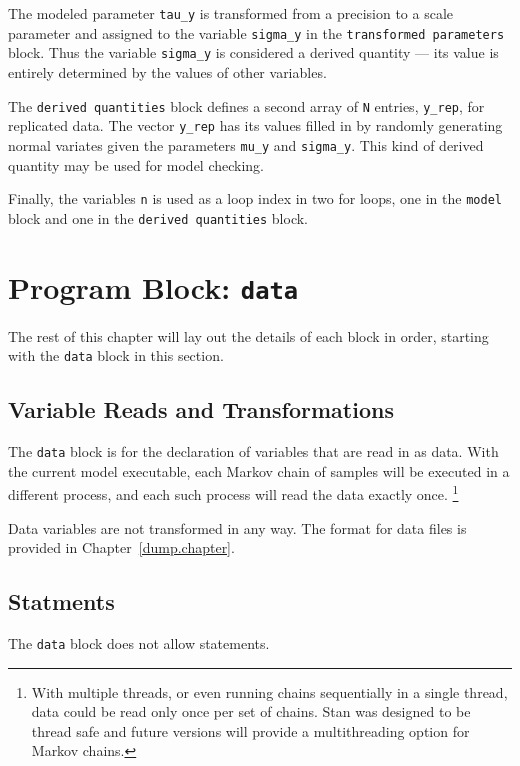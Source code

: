 \documentclass[10pt]{report}
\newcommand{\Stan}{Stan\xspace}
\newcommand{\code}[1]{{\tt #1}}
\newcommand{\refchapter}[1]{Chapter~\ref{#1.chapter}}
\begin{document}
The modeled parameter \code{tau\_y} is transformed from a precision to
a scale parameter and assigned to the variable \code{sigma\_y} in the
\code{transformed parameters} block. Thus the variable \code{sigma\_y}
is considered a derived quantity --- its value is entirely determined
by the values of other variables.  

The \code{derived quantities} block defines a second array of \code{N}
entries, \code{y\_rep}, for replicated data.  The vector \code{y\_rep}
has its values filled in by randomly generating normal variates given
the parameters \code{mu\_y} and \code{sigma\_y}.  This kind of derived
quantity may be used for model checking.

Finally, the variables \code{n} is used as a loop index in two for
loops, one in the \code{model} block and one in the \code{derived
  quantities} block.


\section{Program Block: \code{data}}

The rest of this chapter will lay out the details of each block in
order, starting with the \code{data} block in this section.

\subsection{Variable Reads and Transformations}

The \code{data} block is for the declaration of variables that are
read in as data.  With the current model executable, each Markov chain
of samples will be executed in a different process, and each such
process will read the data exactly once.%
%
\footnote{With multiple threads, or even running chains sequentially
  in a single thread, data could be read only once per set of
  chains. \Stan was designed to be thread safe and future versions 
  will provide a multithreading option for Markov chains.\label{thread.footnote}}
%

Data variables are not transformed in any way.  The format for data
files is provided in \refchapter{dump}.

\subsection{Statments}

The \code{data} block does not allow statements.
\end{document}
